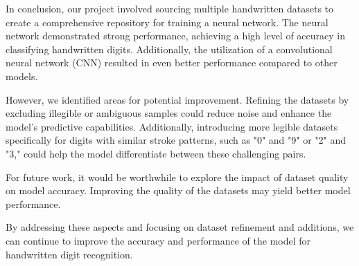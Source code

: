 \documentclass[a4paper,twoside,10pt]{article}
\begin{document}
In conclusion, our project involved sourcing multiple handwritten datasets to create a comprehensive repository for training a neural network. The neural network demonstrated strong performance, achieving a high level of accuracy in classifying handwritten digits. Additionally, the utilization of a convolutional neural network (CNN) resulted in even better performance compared to other models.

However, we identified areas for potential improvement. Refining the datasets by excluding illegible or ambiguous samples could reduce noise and enhance the model's predictive capabilities. Additionally, introducing more legible datasets specifically for digits with similar stroke patterns, such as "0" and "9" or "2" and "3," could help the model differentiate between these challenging pairs.

For future work, it would be worthwhile to explore the impact of dataset quality on model accuracy. Improving the quality of the datasets may yield better model performance.

By addressing these aspects and focusing on dataset refinement and additions, we can continue to improve the accuracy and performance of the model for handwritten digit recognition.

\nocite{*}
\end{document}
